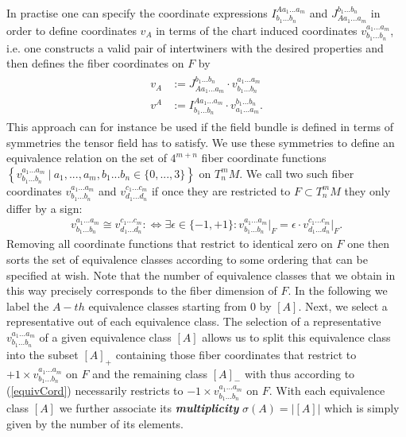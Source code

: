 \documentclass[a4paper,12pt, DIV=14, BCOR=5mm, twoside, headsepline, numbers=noenddot]{scrbook}
\begin{document}
In practise one can specify the coordinate expressions $I^{A a_1 ... a_m}_{b_1 ... b_n}$ and $J^{b_1 ... b_n}_{A a_1 ... a_m}$ in order to define coordinates $v_A$ in terms of the chart induced coordinates $v^{a_1 ... a_m}_{b_1 ... b_n}$, i.e. one constructs a valid pair of intertwiners with the desired properties and then defines the fiber coordinates on $F$ by
\begin{align}
    \begin{aligned}
    v_A &:= J^{b_1 ... b_n}_{A a_1 ... a_m} \cdot v^{a_1 ... a_m}_{b_1 ... b_n}\\
    v^A &:= I^{A a_1 ... a_m}_{b_1 ... b_n} \cdot  v^{b_1 ... b_n}_{a_1 ... a_m} .
    \end{aligned}
\end{align}
This approach can for instance be used if the field bundle is defined in terms of symmetries the tensor field has to satisfy. We use these symmetries to define an equivalence relation on the set of $4^{m+n}$ fiber coordinate functions $\left \{ v^{a_1 ... a_m}_{b_1 ... b_n} \ \vert \  a_1,...,a_m,b_1...b_n \in \{0,...,3 \} \right \}$ on $T^m_nM$. We call two such fiber coordinates $v^{a_1 ... a_m}_{b_1 ... b_n}$ and $v^{c_1 ... c_m}_{d_1 ... d_n}$ if once they are restricted to $F \subset T^m_nM$ they only differ by a sign:
\begin{align}\label{equivCord}
v^{a_1 ... a_m}_{b_1 ... b_n} \cong v^{c_1 ... c_m}_{d_1 ... d_n} : \iff \exists \epsilon \in \{-1,+1 \} : v^{a_1 ... a_m}_{b_1 ... b_n}\vert _F = \epsilon \cdot  v^{c_1 ... c_m}_{d_1 ... d_n}\vert_F.
\end{align}
Removing all coordinate functions that restrict to identical zero on $F$ one then sorts the set of equivalence classes according to some ordering that can be specified at wish.  Note that the number of equivalence classes that we obtain in this way precisely corresponds to the fiber dimension of $F$. In the following we label the $A-th$ equivalence classes starting from 0 by $[A]$. Next, we select a representative out of each equivalence class.  The selection of a representative $v^{a_1 ... a_m}_{b_1 ... b_n}$ of a given equivalence class $[A]$ allows us to split this equivalence class into the subset $[A]_+$ containing those fiber coordinates that restrict to $+1 \times v^{a_1 ... a_m}_{b_1 ... b_n}$  on $F$ and the remaining class $[A]_-$ with thus according to (\ref{equivCord}) necessarily restricts to $-1 \times v^{a_1 ... a_m}_{b_1 ... b_n}$ on $F$.
With each equivalence class $[A]$ we further associate its \textbf{\textit{multiplicity}} $\sigma(A) = \vert [A] \vert$ which is simply given by the number of its elements.
\end{document}
